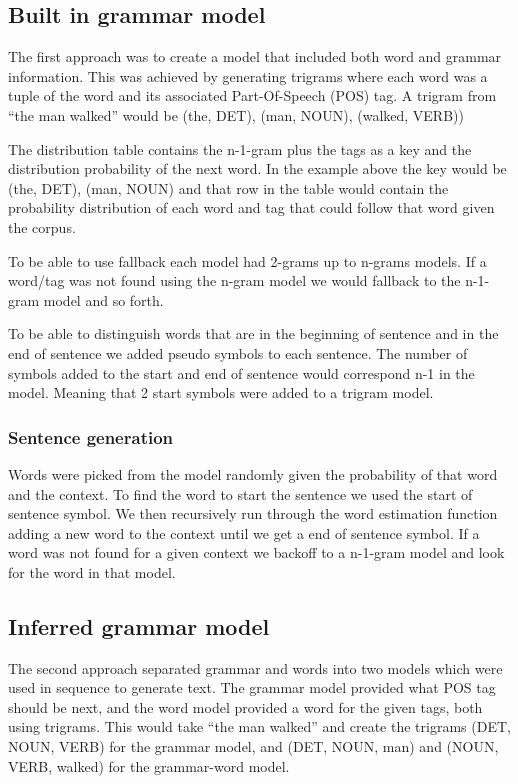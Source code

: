 \documentclass[a4paper,12pt]{article}
\begin{document}
\subsection{Built in grammar model}
The first approach was to create a model that included both word and grammar information. This was achieved by generating trigrams where each word was a tuple of the word and its associated Part-Of-Speech (POS) tag. A trigram from ``the man walked'' would be (the, DET), (man, NOUN), (walked, VERB))

The distribution table contains the n-1-gram plus the tags as a key and the distribution probability of the next word. In the example above the key would be (the, DET), (man, NOUN) and that row in the table would contain the probability distribution of each word and tag that could follow that word given the corpus.

To be able to use fallback each model had 2-grams up to n-grams models. If a word/tag was not found using the n-gram model we would fallback to the n-1-gram model and so forth.

To be able to distinguish words that are in the beginning of sentence and in the end of sentence we added pseudo symbols to each sentence. The number of symbols added to the start and end of sentence would correspond n-1 in the model. Meaning that 2 start symbols were added to a trigram model.

\subsubsection{Sentence generation}
Words were picked from the model randomly given the probability of that word and the context. To find the word to start the sentence we used the start of sentence symbol. We then recursively run through the word estimation function adding a new word to the context until we get a end of sentence symbol. If a word was not found for a given context we backoff to a n-1-gram model and look for the word in that model.

\subsection{Inferred grammar model}
The second approach separated grammar and words into two models which were used in sequence to generate text. The grammar model provided what POS tag should be next, and the word model provided a word for the given tags, both using trigrams. This would take ``the man walked'' and create the trigrams (DET, NOUN, VERB) for the grammar model, and (DET, NOUN, man) and (NOUN, VERB, walked) for the grammar-word model.
\end{document}
